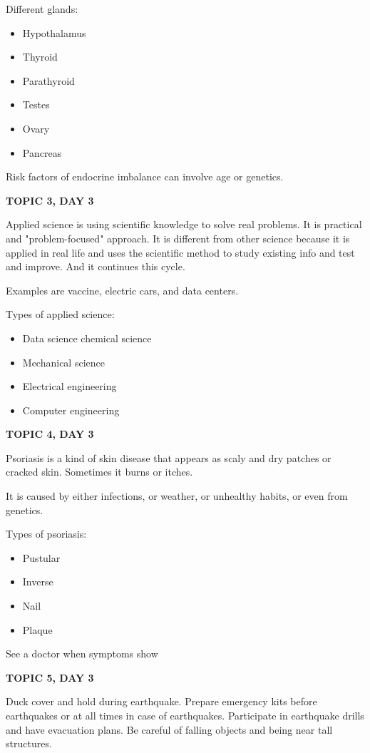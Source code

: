 {{{{Different glands:
\begin{itemize}
    \item Hypothalamus
    \item Thyroid
    \item Parathyroid
    \item Testes
    \item Ovary
    \item Pancreas
\end{itemize}

Risk factors of endocrine imbalance can involve age or genetics. 

\textbf{TOPIC 3, DAY 3}

Applied science is using scientific knowledge to solve real problems. 
It is practical and "problem-focused" approach. It is different from other science because it is applied in real life and uses the scientific method to study existing info and test and improve. And it continues this cycle.


Examples are vaccine, electric cars, and data centers.


Types of applied science:
\begin{itemize}
    \item Data science chemical science
    \item Mechanical science
    \item Electrical engineering
    \item Computer engineering
\end{itemize}

\textbf{TOPIC 4, DAY 3}

Psoriasis is a kind of skin disease that appears as scaly and dry patches or cracked skin. Sometimes it burns or itches. 

It is caused by either infections, or weather, or unhealthy habits, or even from genetics.

Types of psoriasis:
\begin{itemize}
    \item Pustular
    \item Inverse
    \item Nail
    \item Plaque
\end{itemize}

See a doctor when symptoms show

\textbf{TOPIC 5, DAY 3}

Duck cover and hold during earthquake. Prepare emergency kits before earthquakes or at all times in case of earthquakes. Participate in earthquake drills and have evacuation plans. Be careful of falling objects and being near tall structures.


}}}}
